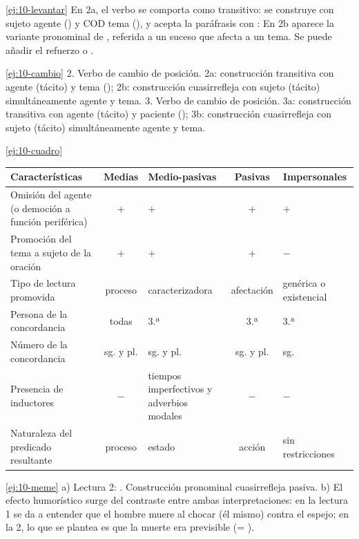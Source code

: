 \begin{solucion}{\ref{ej:10-levantar}}
En 2a, el verbo  se comporta como transitivo: se construye con
sujeto agente () y COD tema (), y
acepta la paráfrasis con :  En 2b
aparece la variante pronominal de , referida a un suceso que
afecta a un tema. Se puede añadir el refuerzo  o .
\end{solucion}

\begin{solucion}{\ref{ej:10-cambio}}
2. Verbo de cambio de posición. 2a: construcción transitiva con agente (tácito)
y tema (); 2b: construcción cuasirrefleja con sujeto
(tácito) simultáneamente agente y tema. 3. Verbo de cambio de posición. 3a:
construcción transitiva con agente (tácito) y paciente (); 3b:
construcción cuasirrefleja con sujeto (tácito) simultáneamente agente y tema.
\end{solucion}

\begin{solucion}{\ref{ej:10-cuadro}}
{\small
\begin{tabularx}{\linewidth}{@{}L c >{\centering\arraybackslash}p{20mm} c
    >{\centering\arraybackslash}p{18mm}@{}}
  \toprule
  Características & Medias & Medio-pasivas & Pasivas & Impersonales \\
  \midrule
  Omisión del agente (o democión a función periférica) & + & + & + & + \\
  Promoción del tema a sujeto de la oración & + & + & + & $-$ \\
  Tipo de lectura promovida & proceso & caracterizadora & afectación & genérica
    o existencial \\
  Persona de la concordancia & todas & 3.ª & 3.ª & 3.ª \\
  Número de la concordancia & sg. y pl. & sg. y pl. & sg. y pl. & sg. \\
  Presencia de inductores & $-$ & tiempos imperfectivos y adverbios modales &
    $-$ & $-$ \\
  Naturaleza del predicado resultante & proceso & estado & acción & sin
    restricciones \\
  \bottomrule
\end{tabularx}}
\end{solucion}

\begin{solucion}{\ref{ej:10-meme}}
a) Lectura 2: . Construcción
pronominal cuasirrefleja pasiva. b) El efecto humorístico surge del contraste
entre ambas interpretaciones: en la lectura 1 se da a entender que el hombre
muere al chocar (él mismo) contra el espejo; en la 2, lo que se plantea es que
la muerte era previsible (= ).
\end{solucion}

